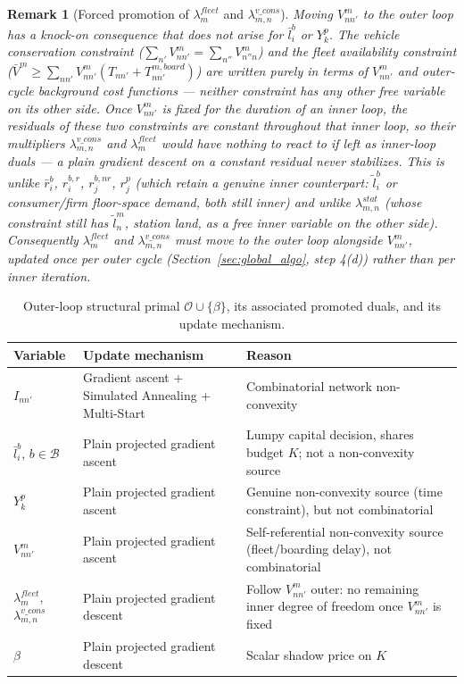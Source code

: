 \documentclass[11pt,a4paper]{article}
\newtheorem{remark}{Remark}
\begin{document}
\begin{remark}[Forced promotion of $\lambda^{fleet}_m$ and $\lambda^{v\_cons}_{m,n}$]
Moving $V^m_{nn'}$ to the outer loop has a knock-on consequence that does not arise for $\bar l_i^b$ or $Y_k^p$. The vehicle conservation constraint ($\sum_{n'}V^m_{nn'} = \sum_{n''}V^m_{n''n}$) and the fleet availability constraint ($\bar V^m \ge \sum_{nn'}V^m_{nn'}(T_{nn'}+T^{m,board}_{nn'})$) are written \emph{purely} in terms of $V^m_{nn'}$ and outer-cycle background cost functions — neither constraint has any other free variable on its other side. Once $V^m_{nn'}$ is fixed for the duration of an inner loop, the residuals of these two constraints are constant throughout that inner loop, so their multipliers $\lambda^{v\_cons}_{m,n}$ and $\lambda^{fleet}_m$ would have nothing to react to if left as inner-loop duals — a plain gradient descent on a constant residual never stabilizes. This is unlike $\bar r_i^b$, $r_i^{b,r}$, $r_j^{b,nr}$, $r_j^p$ (which retain a genuine inner counterpart: $\tilde l_i^{b}$ or consumer/firm floor-space demand, both still inner) and unlike $\lambda^{stat}_{m,n}$ (whose constraint still has $\tilde l^m_n$, station land, as a free inner variable on the other side). Consequently $\lambda^{fleet}_m$ and $\lambda^{v\_cons}_{m,n}$ must move to the outer loop alongside $V^m_{nn'}$, updated once per outer cycle (Section~\ref{sec:global_algo}, step 4(d)) rather than per inner iteration.
\end{remark}

\begin{table}[h!]
    \centering
    \small
    \renewcommand{\arraystretch}{1.2}
    \begin{tabular}{lll}
        \toprule
        \textbf{Variable} & \textbf{Update mechanism} & \textbf{Reason} \\
        \midrule
        $I_{nn'}$ & Gradient ascent + Simulated Annealing + Multi-Start & Combinatorial network non-convexity \\
        $\bar l_i^b$, $b\in\mathcal{B}$ & Plain projected gradient ascent & Lumpy capital decision, shares budget $K$; not a non-convexity source \\
        $Y_k^p$ & Plain projected gradient ascent & Genuine non-convexity source (time constraint), but not combinatorial \\
        $V_{nn'}^m$ & Plain projected gradient ascent & Self-referential non-convexity source (fleet/boarding delay), not combinatorial \\
        $\lambda^{fleet}_m$, $\lambda^{v\_cons}_{m,n}$ & Plain projected gradient descent & Follow $V^m_{nn'}$ outer: no remaining inner degree of freedom once $V^m_{nn'}$ is fixed \\
        $\beta$ & Plain projected gradient descent & Scalar shadow price on $K$ \\
        \bottomrule
    \end{tabular}
    \caption{Outer-loop structural primal $\mathcal{O}\cup\{\beta\}$, its associated promoted duals, and its update mechanism.}
    \label{tab:outer_partition}
\end{table}
\end{document}
